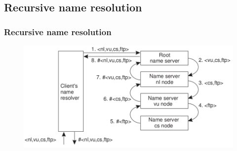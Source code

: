 \documentclass{beamer}
\begin{document}
\subsection{Recursive name resolution}
	\begin{frame}
		\frametitle{Recursive name resolution}
		
		\begin{figure}[hbtp]
		\centering
		\includegraphics[scale=0.45]{recursiv}
		\end{figure}		
		
	\end{frame}
	
	
\end{document}
